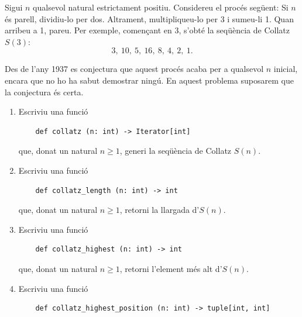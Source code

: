 
\UsePython

\Statement

Sigui $n$ qualsevol natural estrictament positiu. Considereu el procés següent: Si $n$ és parell, dividiu-lo per dos. Altrament, multipliqueu-lo per 3 i sumeu-li 1. Quan arribeu a 1, pareu. Per exemple, començant en 3, s'obté la seqüència de Collatz $S(3)$:
\[
3,~ 10,~ 5,~ 16,~ 8,~ 4,~ 2,~ 1 .
\]

Des de l'any 1937 es conjectura que aquest procés acaba per a qualsevol $n$ inicial, encara que no ho ha sabut demostrar ningú. En aquest problema suposarem que la conjectura és certa.

\begin{enumerate}

    \item Escriviu una funció 

    \begin{lstlisting}
    def collatz (n: int) -> Iterator[int]
    \end{lstlisting}\vspace*{-6mm}    
    
    que, donat un natural $n\ge 1$, generi la seqüència de Collatz $S(n)$.

    \item Escriviu una funció 

    \begin{lstlisting}
    def collatz_length (n: int) -> int
    \end{lstlisting}\vspace*{-6mm}
    
    que, donat un natural $n\ge 1$, retorni la llargada d'$S(n)$.

    \item Escriviu una funció 

    \begin{lstlisting}
    def collatz_highest (n: int) -> int
    \end{lstlisting}\vspace*{-6mm}

    que, donat un natural $n\ge 1$, retorni l'element més alt d'$S(n)$.

    \item Escriviu una funció 

    \begin{lstlisting}
    def collatz_highest_position (n: int) -> tuple[int, int]
    \end{lstlisting}\vspace*{-6mm}


\end{enumerate}
